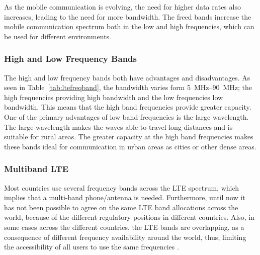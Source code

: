 As the mobile communication is evolving, the need for higher data rates also increases, leading to the need for more bandwidth. The freed bands increase the mobile communication spectrum both in the low and high frequencies, which can be used for different environments.  

\subsubsection{High and Low Frequency Bands}
The high and low frequency bands both have advantages and disadvantages. As seen in Table~\ref{tab:ltefreqband}, the bandwidth varies form \SIrange{5}{90}{MHz}; the high frequencies providing high bandwidth and the low frequencies low bandwidth. This means that the high band frequencies provide greater capacity. One of the primary advantages of low band frequencies is the large wavelength. The large wavelength makes the waves able to travel long distances and is suitable for rural areas. The greater capacity at the high band frequencies makes these bands ideal for communication in urban areas as cities or other dense areas.

\subsubsection{Multiband LTE}
Most countries use several frequency bands across the LTE spectrum, which implies that a multi-band phone/antenna is needed.  
Furthermore, until now it has not been possible to agree on the same LTE band allocations across the world, because of the different regulatory positions in different countries. Also, in some cases across the different countries, the LTE bands are overlapping, as a consequence of different frequency availability around the world, thus, limiting the accessibility of all users to use the same frequencies \cite{radio2015electronics}.  

